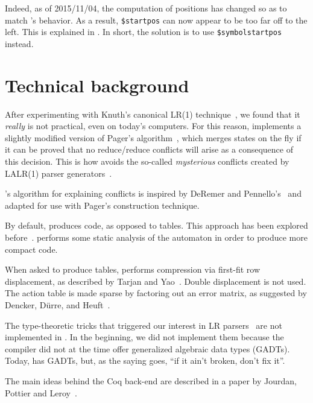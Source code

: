 \documentclass[onecolumn,11pt,nocopyrightspace,preprint]{sigplanconf}
\begin{document}
Indeed, as of 2015/11/04, the computation of positions has changed so as to match \ocamlyacc's
behavior. As a result, \texttt{\$startpos} can now appear to be too far off to the left. This is explained
in . In short, the solution is to use \verb+$symbolstartpos+ instead.


\section{Technical background}

After experimenting with Knuth's canonical LR(1) technique~\cite{knuth-lr-65},
we found that it \emph{really} is not practical, even on today's computers.
For this reason, \menhir implements a slightly modified version of Pager's
algorithm~\cite{pager-77}, which merges states on the fly if it can be proved
that no reduce/reduce conflicts will arise as a consequence of this decision.
This is how \menhir avoids the so-called \emph{mysterious} conflicts created
by LALR(1) parser generators~\cite[section 5.7]{bison}.

\menhir's algorithm for explaining conflicts is inspired by DeRemer and
Pennello's~\cite{deremer-pennello-82} and adapted for use with Pager's
construction technique.

By default, \menhir produces code, as opposed to tables. This approach has
been explored before~\cite{bhamidipaty-proebsting-98,horspool-faster-90}.
\menhir performs some static analysis of the automaton in order to produce
more compact code.

When asked to produce tables, \menhir performs compression via first-fit
row displacement, as described by Tarjan and Yao~\cite{tarjan-yao-79}.
Double displacement is not used. The action table is made sparse by
factoring out an error matrix, as suggested by Dencker, Dürre, and
Heuft~\cite{dencker-84}.

The type-theoretic tricks that triggered our interest in LR
parsers~\cite{pottier-regis-gianas-typed-lr} are not implemented in \menhir.
In the beginning, we did not implement them because the \ocaml compiler did
not at the time offer generalized algebraic data types (GADTs). Today, \ocaml
has GADTs, but, as the saying goes, ``if it ain't broken, don't fix it''.

The main ideas behind the Coq back-end are described in a paper by Jourdan,
Pottier and Leroy~\cite{jourdan-leroy-pottier-12}.
\end{document}
